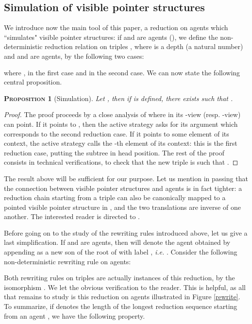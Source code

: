 \documentclass{article}
\newtheorem{proposition}{\textsc{Proposition}}
\begin{document}
\subsection{Simulation of visible pointer structures}

We introduce now the main tool of this paper, a reduction on agents which ``simulates" visible pointer structures: if  and  are agents (),
we define the non-deterministic reduction relation  on triples , where  is a depth (a natural number) and  and  are agents, by the following two cases:

where ,  in the first case and  in the second case. We can now state the following central proposition.

\begin{proposition}[Simulation]
Let , then if  is defined, there exists  such that .
\end{proposition}
\begin{proof}
The proof proceeds by a close analysis of where in its -view (resp. -view)  can point. If it points to , then the active strategy
asks for its argument which corresponds to the second reduction case. If it points to some element  of its context, the active strategy calls the -th
element of its context: this is the first reduction case, putting the subtree  in head position. The rest of the proof consists in technical verifications,
to check that the new triple  is such that .
\end{proof}

The result above will be sufficient for our purpose. Let us mention in passing that the connection between visible pointer structures
and agents is in fact tighter: a reduction chain starting from a triple  can also be canonically mapped to a pointed visible pointer structure in ,
and the two translations are inverse of one another. The interested reader is directed to \cite{phd}.

Before going on to the study of the rewriting rules introduced above, let us give a last simplification. If  and  are agents,
then  will denote the agent obtained by appending  as a new son of the root of  with label , \emph{i.e.} .
Consider the following non-deterministic rewriting rule on agents:

Both rewriting rules on triples  are actually instances of this reduction, by the isomorphism . We let the obvious verification
to the reader. This is helpful, as all that remains to study is this reduction on agents illustrated in Figure \ref{rewrite}. To summarize, if  denotes the length of the longest reduction sequence
starting from an agent , we have the following property.
\end{document}

